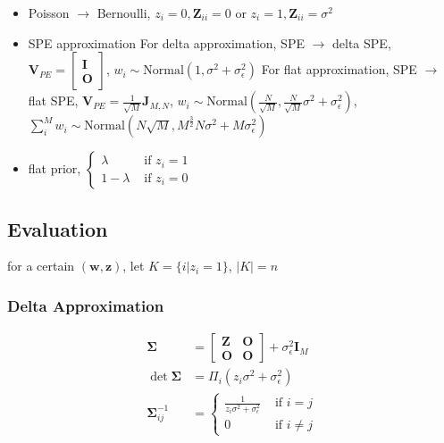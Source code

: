 \documentclass[notitlepage]{article}
\begin{document}
\begin{itemize}
    \item Poisson $\rightarrow$ Bernoulli, $z_i=0,\bm{Z}_{ii}=0$ or $z_i=1,\bm{Z}_{ii}=\sigma^2$
    \item SPE approximation
    \iitem For delta approximation, SPE $\rightarrow$ delta SPE, $\bm{V}_{PE}=\begin{bmatrix}\bm{I} \\\bm{O}\end{bmatrix}$, $w_i\sim \mathrm{Normal}(1,\sigma^2+\sigma_\epsilon^2)$
    \iitem For flat approximation, SPE $\rightarrow$ flat SPE, $\bm{V}_{PE}=\frac{1}{\sqrt{M}}\bm{J}_{M,N}$, $w_i\sim \mathrm{Normal}(\frac{N}{\sqrt{M}},\frac{N}{\sqrt{M}}\sigma^2+\sigma_\epsilon^2)$, $\sum_i^M w_i\sim \mathrm{Normal}(N\sqrt{M},M^{\frac{3}{2}}N\sigma^2+M\sigma_\epsilon^2)$
    \item flat prior, $\begin{cases}
        \lambda & \text{ if } z_i=1 \\ 
        1-\lambda & \text{ if } z_i=0 
    \end{cases}$
\end{itemize}

\subsection{Evaluation}

for a certain $(\bm{w}, \bm{z})$, let $K=\{i|z_i=1\}$, $|K|=n$

\subsubsection{Delta Approximation}

\begin{align}
    \bm{\Sigma} &= \begin{bmatrix}
        \bm{Z} & \bm{O} \\
        \bm{O} & \bm{O}
    \end{bmatrix} + \sigma_\epsilon^2\bm{I}_M \\
    \det\bm{\Sigma} &= \Pi_i (z_i\sigma^2+\sigma_\epsilon^2) \\
    \bm{\Sigma}_{ij}^{-1} &= \begin{cases}
        \frac{1}{z_i\sigma^2+\sigma_\epsilon^2} & \text{ if }  i=j \\ 
        0 & \text{ if }  i\neq j 
    \end{cases}
\end{align}
\end{document}
